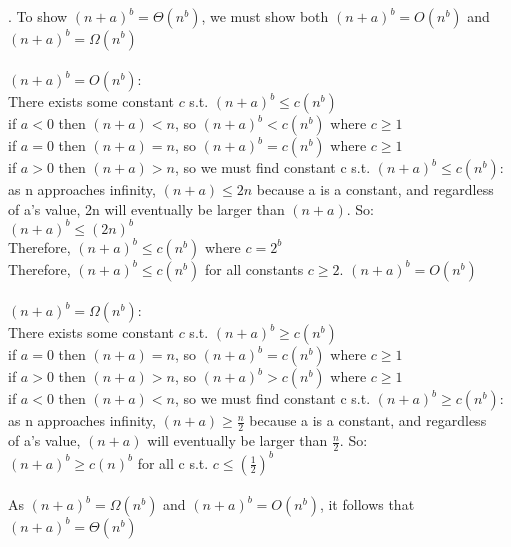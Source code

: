 \documentclass[11pt, oneside]{article}   	%
\begin{document}
.  To show $(n+a)^{b} = \Theta (n^{b})$, we must show both $(n+a)^{b} = O(n^{b})$ and $(n+a)^b= \Omega (n^{b})$\\
\\
\indent
$(n+a)^{b} = O(n^{b})$:\\
\indent\indent
There exists some constant $c$ s.t. $(n+a)^{b} \leq c(n^{b})$\\
\indent\indent\indent
if $a <  0$ then $(n+a) < n $, so $(n+a)^b < c(n^b)$ where $c\geq 1$\\
\indent\indent\indent
if $a = 0$ then $(n+a) = n$, so $(n+a)^b = c(n^b)$ where $c \geq 1$\\
\indent\indent\indent
if $a > 0$ then $(n+a) > n$, so we must find constant c s.t. $(n+a)^b \leq c(n^b)$:\\
\indent\indent\indent\indent
as n approaches infinity, $(n+a) \leq 2n$ because a is a constant, and regardless\\
\indent\indent\indent\indent of a's value, 2n will eventually be larger than $(n+a)$. So:\\
\indent\indent\indent\indent\indent
$(n+a)^b \leq (2n)^b$\\
\indent\indent\indent\indent\indent
Therefore, $(n+a)^b \leq c(n^b)$ where $c=2^b$\\
\indent\indent
Therefore, $(n+a)^b \leq c(n^b)$ for all  constants $c \geq 2.$ $(n+a)^b = O(n^b)$\\
\\
\indent $(n+a)^{b} = \Omega (n^{b})$:\\
\indent\indent
There exists some constant $c$ s.t. $(n+a)^{b} \geq c(n^{b})$\\
\indent\indent\indent
if $a = 0$ then $(n+a) = n$, so $(n+a)^b = c(n^b)$ where $c \geq 1$\\
\indent\indent\indent
if $a > 0$ then $(n+a) >n $, so $(n+a)^b > c(n^b)$ where $c\geq 1$\\
\indent\indent\indent
if $a < 0$ then $(n+a) < n$, so we must find constant c s.t. $(n+a)^b \geq c(n^b)$:\\
\indent\indent\indent\indent
as n approaches infinity, $(n+a) \geq \frac{n}{2}$ because a is a constant, and regardless\\
\indent\indent\indent\indent of a's value, $(n+a)$ will eventually be larger than $\frac{n}{2}$. So:\\
\indent\indent\indent\indent $(n+a)^b \geq c(n)^b$ for all c s.t. $c \leq (\frac{1}{2})^b$\\
\\
\indent As $(n+a)^b = \Omega (n^b)$ and $(n+a)^b = O(n^b)$, it follows that $(n+a)^b = \Theta (n^b)$\\
\end{document}
